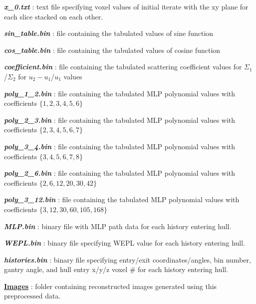 \documentclass[landscape]{article}
\begin{document}
\begin{myEnumerate}[labelindent=0pt, leftmargin=*]
\begin{myEnumerate}[labelindent=1pt, leftmargin=*]
\begin{myEnumerate}[labelindent=1pt, leftmargin=*]
\begin{myEnumerate}[labelindent=1pt, leftmargin=*]
\begin{myEnumerate}[labelindent=1pt, leftmargin=*]
\begin{myEnumerate}[labelindent=1pt, leftmargin=*]
\begin{myEnumerate}[labelindent=1pt, leftmargin=*]
\begin{myEnumerate}[labelindent=1pt, leftmargin=*]
\begin{myEnumerate}[labelindent=1pt, leftmargin=*]
                                    \item \textbf{\textit{x\_0.txt}} : text file specifying voxel values of initial iterate with the xy plane for each slice stacked on each other.
                                    \item \textbf{\textit{sin\_table.bin}} : file containing the tabulated values of sine function
                                    \item \textbf{\textit{cos\_table.bin}} : file containing the tabulated values of cosine function
                                    \item \textbf{\textit{coefficient.bin}} : file containing the tabulated scattering coefficient values for $\Sigma_1$/$\Sigma_2$ for $u_2-u_1$/$u_1$ values
                                    \item \textbf{\textit{poly\_1\_2.bin}} : file containing the tabulated MLP polynomial values with coefficients $\{1,2,3,4,5,6\}$
                                    \item \textbf{\textit{poly\_2\_3.bin}} : file containing the tabulated MLP polynomial values with coefficients $\{2,3,4,5,6,7\}$
                                    \item \textbf{\textit{poly\_3\_4.bin}} : file containing the tabulated MLP polynomial values with coefficients $\{3,4,5,6,7,8\}$
                                    \item \textbf{\textit{poly\_2\_6.bin}} : file containing the tabulated MLP polynomial values with coefficients $\{2,6,12,20,30,42\}$
                                    \item \textbf{\textit{poly\_3\_12.bin}} : file containing the tabulated MLP polynomial values with coefficients $\{3,12,30,60,105,168\}$                                 
                                    \item \textbf{\textit{MLP.bin}} : binary file with MLP path data for each history entering hull.
                                    \item \textbf{\textit{WEPL.bin}} : binary file specifying WEPL value for each history entering hull.
                                    \item \textbf{\textit{histories.bin}} : binary file specifying entry/exit coordinates/angles, bin number, gantry angle, and hull entry x/y/z voxel \# for each history entering hull.
                                    \item \ul{\textbf{Images}} : folder containing reconstructed images generated using this preprocessed data.

\end{myEnumerate}
\end{myEnumerate}
\end{myEnumerate}
\end{myEnumerate}
\end{myEnumerate}
\end{myEnumerate}
\end{myEnumerate}
\end{myEnumerate}
\end{myEnumerate}
\end{document}
